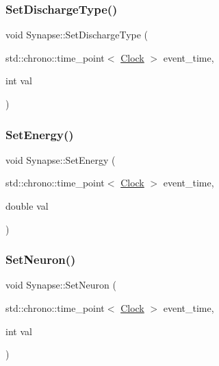 \mbox{\label{classSynapse_a1956d553c15fa1aea12d39725baeca1b}} 
\subsubsection{\texorpdfstring{Set\+Discharge\+Type()}{SetDischargeType()}}
{\footnotesize\ttfamily void Synapse\+::\+Set\+Discharge\+Type (\begin{DoxyParamCaption}\item[{std\+::chrono\+::time\+\_\+point$<$ \mbox{\hyperlink{universe_8h_a0ef8d951d1ca5ab3cfaf7ab4c7a6fd80}{Clock}} $>$}]{event\+\_\+time,  }\item[{int}]{val }\end{DoxyParamCaption})\hspace{0.3cm}{\ttfamily [inline]}}

\mbox{\label{classSynapse_aa90b66763c8aca2ad8df535ffed5d4a9}} 
\subsubsection{\texorpdfstring{Set\+Energy()}{SetEnergy()}}
{\footnotesize\ttfamily void Synapse\+::\+Set\+Energy (\begin{DoxyParamCaption}\item[{std\+::chrono\+::time\+\_\+point$<$ \mbox{\hyperlink{universe_8h_a0ef8d951d1ca5ab3cfaf7ab4c7a6fd80}{Clock}} $>$}]{event\+\_\+time,  }\item[{double}]{val }\end{DoxyParamCaption})\hspace{0.3cm}{\ttfamily [inline]}}

\mbox{\label{classSynapse_a278f054df3f4ff25683787ba8fe78263}} 
\subsubsection{\texorpdfstring{Set\+Neuron()}{SetNeuron()}}
{\footnotesize\ttfamily void Synapse\+::\+Set\+Neuron (\begin{DoxyParamCaption}\item[{std\+::chrono\+::time\+\_\+point$<$ \mbox{\hyperlink{universe_8h_a0ef8d951d1ca5ab3cfaf7ab4c7a6fd80}{Clock}} $>$}]{event\+\_\+time,  }\item[{int}]{val }\end{DoxyParamCaption})}

